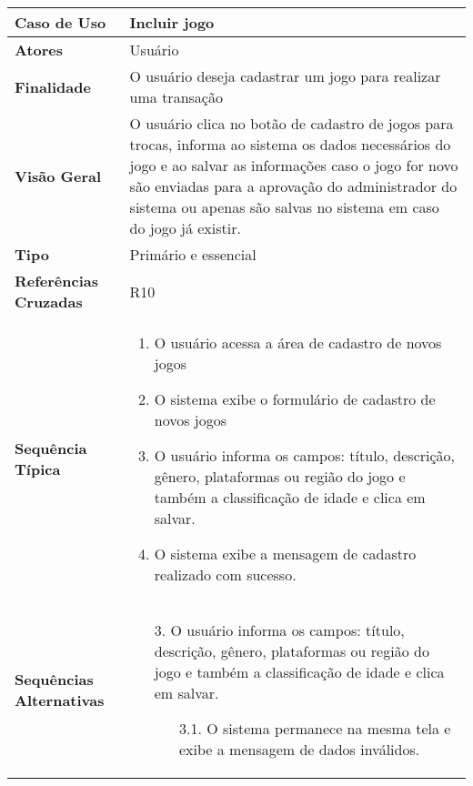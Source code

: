 \documentclass[a4paper,11pt]{article}
\begin{document}
\begin{table}[H]
		\begin{tabularx}{\textwidth}{|l|X|}
		\hline
			\textbf{Caso de Uso} &  Incluir jogo \\ \hline
			\textbf{Atores} &  Usuário \\ \hline
			\textbf{Finalidade} &  O usuário deseja cadastrar um jogo para realizar uma transação \\ \hline
			\textbf{Visão Geral} &  O usuário clica no botão de cadastro de jogos para trocas, informa ao sistema os dados necessários do jogo e ao salvar as informações caso o jogo for novo são enviadas para a aprovação do administrador do sistema ou apenas são salvas no sistema em caso do jogo já existir. \\ \hline
			\textbf{Tipo} & Primário e essencial \\ \hline
			\textbf{Referências Cruzadas} & R10 \\ \hline
			\textbf{Sequência Típica} & 
			\begin{enumerate}
			\item O usuário acessa a área de cadastro de novos jogos
			\item O sistema exibe o formulário de cadastro de novos jogos
			\item O usuário informa os campos: título, descrição, gênero, plataformas ou região do jogo e também a classificação de idade e clica em salvar.
			\item O sistema exibe a mensagem de cadastro realizado com sucesso.
						
			
			\end{enumerate} \\ \hline
			\textbf{Sequências Alternativas} & 
			\begin{itemize}
				\item[3.] O usuário informa os campos: título, descrição, gênero, plataformas ou região do jogo e também a classificação de idade e clica em salvar.
				\begin{itemize}
					\item[3.1.] O sistema permanece na mesma tela e exibe a mensagem de dados inválidos.
				\end{itemize}
			\end{itemize} \\ \hline
		\end{tabularx}
\end{table}
\end{document}

